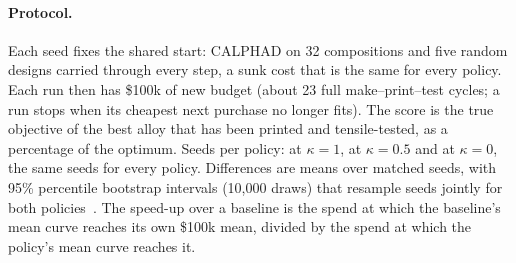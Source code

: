 \documentclass[11pt]{article}
\let\cite\autocite
\begin{document}
\paragraph{Protocol.} Each seed fixes the shared start: CALPHAD on 32
compositions and five random designs carried through every step, a sunk cost
that is the same for every policy. Each run then has \$100k of new budget
(about 23 full make--print--test cycles; a run stops when its cheapest next
purchase no longer fits). The score is the true objective of the best alloy that
has been printed and tensile-tested, as a percentage of the optimum. Seeds per
policy:  at $\kappa=1$,  at $\kappa=0.5$ and
 at $\kappa=0$, the same seeds for every policy. Differences are
means over matched seeds, with 95\% percentile bootstrap intervals (10,000
draws) that resample seeds jointly for both policies~\cite{efron1993}. The
speed-up over a baseline is the spend at which the baseline's mean curve reaches
its own \$100k mean, divided by the spend at which the policy's mean curve
reaches it.
\end{document}

